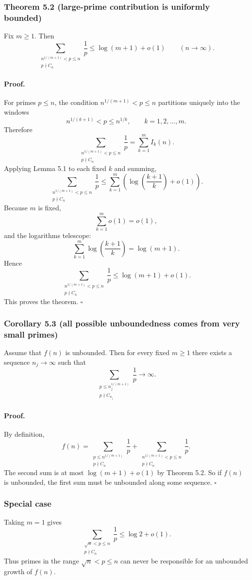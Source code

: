 \subsubsection*{Theorem 5.2 (large-prime contribution is uniformly bounded)}
Fix $m\ge 1$.
Then
\[
\sum_{\substack{n^{1/(m+1)}<p\le n\\ p\nmid C_n}}\frac1p
\le \log(m+1)+o(1)
\qquad (n\to\infty).
\]

\paragraph{Proof.}
For primes $p\le n$, the condition $n^{1/(m+1)}<p\le n$ partitions uniquely into the windows
\[
n^{1/(k+1)}<p\le n^{1/k},
\qquad
k=1,2,\dots,m.
\]
Therefore
\[
\sum_{\substack{n^{1/(m+1)}<p\le n\\ p\nmid C_n}}\frac1p
=
\sum_{k=1}^m I_k(n).
\]
Applying Lemma 5.1 to each fixed $k$ and summing,
\[
\sum_{\substack{n^{1/(m+1)}<p\le n\\ p\nmid C_n}}\frac1p
\le
\sum_{k=1}^m \left(\log\!\left(\frac{k+1}{k}\right)+o(1)\right).
\]
Because $m$ is fixed,
\[
\sum_{k=1}^m o(1)=o(1),
\]
and the logarithms telescope:
\[
\sum_{k=1}^m \log\!\left(\frac{k+1}{k}\right)=\log(m+1).
\]
Hence
\[
\sum_{\substack{n^{1/(m+1)}<p\le n\\ p\nmid C_n}}\frac1p
\le \log(m+1)+o(1).
\]
This proves the theorem. \hfill$\square$

\subsubsection*{Corollary 5.3 (all possible unboundedness comes from very small primes)}
Assume that $f(n)$ is unbounded.
Then for every fixed $m\ge 1$ there exists a sequence $n_j\to\infty$ such that
\[
\sum_{\substack{p\le n_j^{1/(m+1)}\\ p\nmid C_{n_j}}}\frac1p \to \infty.
\]

\paragraph{Proof.}
By definition,
\[
f(n)
=
\sum_{\substack{p\le n^{1/(m+1)}\\ p\nmid C_n}}\frac1p
+
\sum_{\substack{n^{1/(m+1)}<p\le n\\ p\nmid C_n}}\frac1p.
\]
The second sum is at most $\log(m+1)+o(1)$ by Theorem 5.2.
So if $f(n)$ is unbounded, the first sum must be unbounded along some sequence.
\hfill$\square$

\subsubsection*{Special case}
Taking $m=1$ gives
\[
\sum_{\substack{\sqrt{n}<p\le n\\ p\nmid C_n}}\frac1p\le \log 2+o(1).
\]
Thus primes in the range $\sqrt{n}<p\le n$ can never be responsible for an unbounded growth of $f(n)$.

